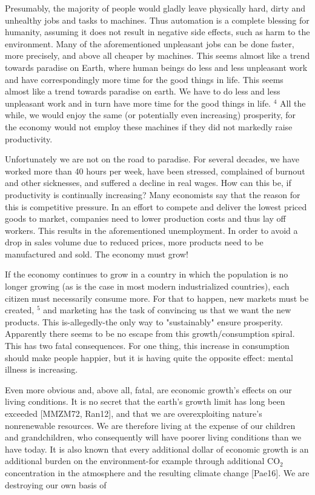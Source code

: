 \documentclass[10pt]{article}
\begin{document}
Presumably, the majority of people would gladly leave physically hard, dirty and unhealthy jobs and tasks to machines. Thus automation is a complete blessing for humanity, assuming it does not result in negative side effects, such as harm to the environment. Many of the aforementioned unpleasant jobs can be done faster, more precisely, and above all cheaper by machines. This seems almost like a trend towards paradise on Earth, where human beings do less and less unpleasant work and have correspondingly more time for the good things in life. This seems almost like a trend towards paradise on earth. We have to do less and less unpleasant work and in turn have more time for the good things in life. ${ }^{4}$ All the while, we would enjoy the same (or potentially even increasing) prosperity, for the economy would not employ these machines if they did not markedly raise productivity.

Unfortunately we are not on the road to paradise. For several decades, we have worked more than 40 hours per week, have been stressed, complained of burnout and other sicknesses, and suffered a decline in real wages. How can this be, if productivity is continually increasing? Many economists say that the reason for this is competitive pressure. In an effort to compete and deliver the lowest priced goods to market, companies need to lower production costs and thus lay off workers. This results in the aforementioned unemployment. In order to avoid a drop in sales volume due to reduced prices, more products need to be manufactured and sold. The economy must grow!

If the economy continues to grow in a country in which the population is no longer growing (as is the case in most modern industrialized countries), each citizen must necessarily consume more. For that to happen, new markets must be created, ${ }^{5}$ and marketing has the task of convincing us that we want the new products. This is-allegedly-the only way to "sustainably" ensure prosperity. Apparently there seems to be no escape from this growth/consumption spiral. This has two fatal consequences. For one thing, this increase in consumption should make people happier, but it is having quite the opposite effect: mental illness is increasing.

Even more obvious and, above all, fatal, are economic growth's effects on our living conditions. It is no secret that the earth's growth limit has long been exceeded [MMZM72, Ran12], and that we are overexploiting nature's nonrenewable resources. We are therefore living at the expense of our children and grandchildren, who consequently will have poorer living conditions than we have today. It is also known that every additional dollar of economic growth is an additional burden on the environment-for example through additional $\mathrm{CO}_{2}$ concentration in the atmosphere and the resulting climate change [Pae16]. We are destroying our own basis of
\end{document}
